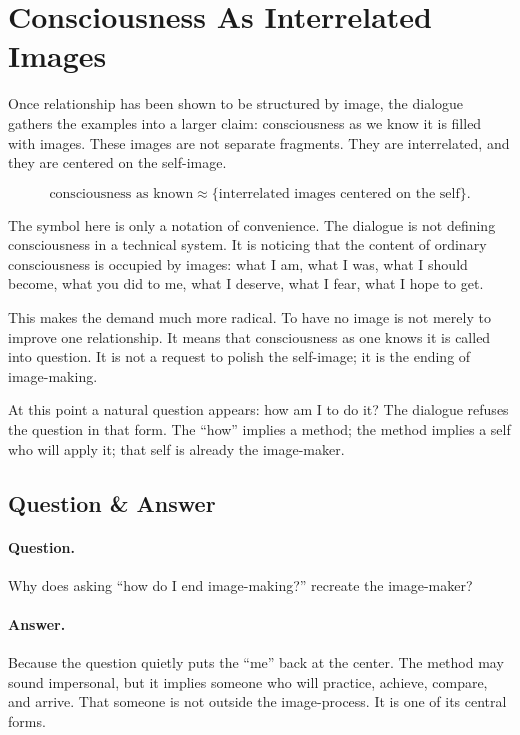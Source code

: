 \section{Consciousness As Interrelated Images}

Once relationship has been shown to be structured by image, the dialogue gathers the examples into a larger claim: consciousness as we know it is filled with images. These images are not separate fragments. They are interrelated, and they are centered on the self-image.

\begin{equation}
\text{consciousness as known}
\approx
\{\text{interrelated images centered on the self}\}.
\end{equation}

The symbol here is only a notation of convenience. The dialogue is not defining consciousness in a technical system. It is noticing that the content of ordinary consciousness is occupied by images: what I am, what I was, what I should become, what you did to me, what I deserve, what I fear, what I hope to get.

This makes the demand much more radical. To have no image is not merely to improve one relationship. It means that consciousness as one knows it is called into question. It is not a request to polish the self-image; it is the ending of image-making.

At this point a natural question appears: how am I to do it? The dialogue refuses the question in that form. The ``how'' implies a method; the method implies a self who will apply it; that self is already the image-maker.

\subsection{Question \& Answer}

\paragraph{Question.}
Why does asking ``how do I end image-making?'' recreate the image-maker?

\paragraph{Answer.}
Because the question quietly puts the ``me'' back at the center. The method may sound impersonal, but it implies someone who will practice, achieve, compare, and arrive. That someone is not outside the image-process. It is one of its central forms.

